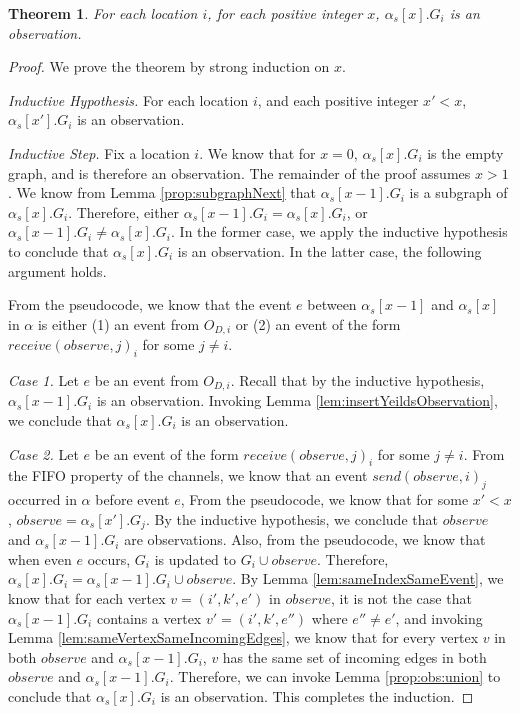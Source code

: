 \documentclass[11pt]{article}
\newtheorem{theorem}{Theorem}
\numberwithin{theorem}{section}
\begin{document}
\begin{theorem}
\label{thm:GiIsObs}
For each location $i$, for each positive integer $x$, $\alpha_s[x].G_i$ is an observation.
\end{theorem}
\begin{proof}
We prove the theorem by strong induction on $x$.

\emph{Inductive Hypothesis.} For each location $i$, and each positive integer $x' < x$, $\alpha_s[x'].G_i$ is an observation.

\emph{Inductive Step.} Fix a location $i$. We know that for $x = 0$, $\alpha_s[x].G_i$ is the empty graph, and is therefore an observation. The remainder of the proof assumes $x >1$. We know from Lemma \ref{prop:subgraphNext} that $\alpha_s[x-1].G_i$ is a subgraph of $\alpha_s[x].G_i$. Therefore, either $\alpha_s[x-1].G_i = \alpha_s[x].G_i$, or $\alpha_s[x-1].G_i \neq \alpha_s[x].G_i$. In the former case, we apply the inductive hypothesis to conclude that $\alpha_s[x].G_i$ is an observation. In the latter case, the following argument holds.

From the pseudocode, we know that the event $e$ between $\alpha_s[x-1]$ and $\alpha_s[x]$ in $\alpha$ is either (1) an event from $O_{D,i}$ or (2) an event of the form $receive(observe, j)_i$ for some $j \neq i$.

\emph{Case 1.} Let $e$ be an event from $O_{D,i}$. Recall that by the inductive hypothesis, $\alpha_s[x-1].G_i$ is an observation. Invoking Lemma \ref{lem:insertYeildsObservation}, we conclude that $\alpha_s[x].G_i$ is an observation.

\emph{Case 2.} Let $e$ be an event of the form $receive(observe, j)_i$ for some $j \neq i$. From the FIFO property of the channels, we know that an event $send(observe,i)_j$ occurred in $\alpha$ before event $e$, From the pseudocode, we know that for some $x' < x$, $observe = \alpha_s[x'].G_j$. By the inductive hypothesis, we conclude that $observe$ and $\alpha_s[x-1].G_i$ are observations. Also, from the pseudocode, we know that when even $e$ occurs, $G_i$ is updated to $G_i \cup observe$. Therefore,  $\alpha_s[x].G_i = \alpha_s[x-1].G_i \cup observe$. 
By Lemma \ref{lem:sameIndexSameEvent}, we know that for each vertex $v = (i',k',e')$ in $observe$, it is not the case that $\alpha_s[x-1].G_i$ contains a vertex $v' = (i',k',e'')$ where $e'' \neq e'$, and invoking Lemma \ref{lem:sameVertexSameIncomingEdges}, we know that for every vertex $v$ in both $observe$ and $\alpha_s[x-1].G_i$, $v$ has the same set of incoming edges in both $observe$ and $\alpha_s[x-1].G_i$.
Therefore, we can invoke Lemma \ref{prop:obs:union} to conclude that $\alpha_s[x].G_i$ is an observation. This completes the induction.
\end{proof}
\end{document}
